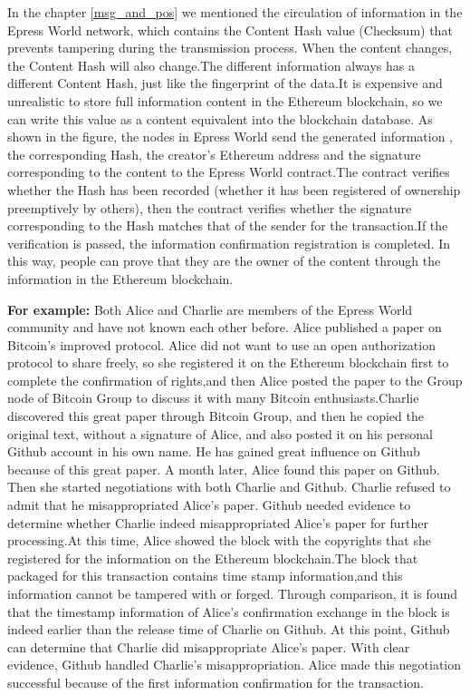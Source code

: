 \documentclass{article}
\begin{document}
    In the chapter \ref{msg_and_pos} we mentioned the circulation of information in the Epress World network, which contains the Content Hash value (Checksum) that prevents tampering during the transmission process. When the content changes, the Content Hash will also change.The different information always has a different Content Hash, just like the fingerprint of the data.It is expensive and unrealistic to store full information content in the Ethereum blockchain, so we can write this value as a content equivalent into the blockchain database.
    As shown in the figure, the nodes in Epress World send the generated information , the corresponding Hash, the creator's Ethereum address and the signature corresponding to the content to the Epress World contract.The contract verifies whether the Hash has been recorded (whether it has been registered of ownership preemptively by others), then the contract verifies whether the signature corresponding to the Hash matches that of the sender for the transaction.If the verification is passed, the information confirmation registration is completed. In this way, people can prove that they are the owner of the content through the information in the Ethereum blockchain.
    ~\newline
    \begin{blockqt}
    \textbf{For example: }Both Alice and Charlie are members of the Epress World community and have not known each other before. Alice published a paper on Bitcoin's improved protocol. Alice did not want to use an open authorization protocol to share freely, so she registered it on the Ethereum blockchain first to complete the confirmation of rights,and then Alice posted the paper to the Group node of Bitcoin Group to discuss it with many Bitcoin enthusiasts.Charlie discovered this great paper through Bitcoin Group, and then he copied the original text, without a signature of Alice, and also posted it on his personal Github account in his own name. He has gained great influence on Github because of this great paper. A month later, Alice found this paper on Github. Then she started negotiations with both Charlie and Github. Charlie refused to admit that he misappropriated Alice's paper. Github needed evidence to determine whether Charlie indeed misappropriated Alice's paper for further processing.At this time, Alice showed the block with the copyrights that she registered for the information on the Ethereum blockchain.The block that packaged for this transaction contains time stamp information,and this information cannot be tampered with or forged. Through comparison, it is found that the timestamp information of Alice's confirmation exchange in the block is indeed earlier than the release time of Charlie on Github. At this point, Github can determine that Charlie did misappropriate Alice's paper. With clear evidence, Github handled Charlie's misappropriation. Alice made this negotiation successful because of the first information confirmation for the transaction.
    \end{blockqt}
\end{document}
